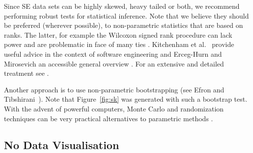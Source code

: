 \documentclass[preprint,10pt]{elsarticle}
\newcommand{\RED}{\color{red}}
\newcommand{\BLACK}{\color{black}}
\begin{document}
Since SE data sets can be highly skewed, heavy tailed or both, \RED we recommend performing robust tests for statistical inference. Note that we believe they should be preferred (wherever possible), to non-parametric statistics that are based on ranks. The latter, \BLACK for example the Wilcoxon signed rank procedure can lack power and are problematic in face of many ties \cite{Blai85}.  Kitchenham et al.~\cite{Kitc17} provide useful advice in the context of software engineering and Erceg-Hurn and Mirosevich an accessible general overview \cite{Erce08}.  For an extensive and detailed treatment see \cite{Wilc12}.  

Another approach is to use non-parametric bootstrapping (see Efron and Tibshirani~\cite[p220-223]{efron93}). Note that  Figure~\ref{fig:sk} was generated with such a bootstrap test.  With the advent of powerful computers, Monte Carlo and randomization techniques can be very practical alternatives to parametric methods \cite{Manl97}.

\subsection{No Data Visualisation}\label{sec:viz}
\end{document}
